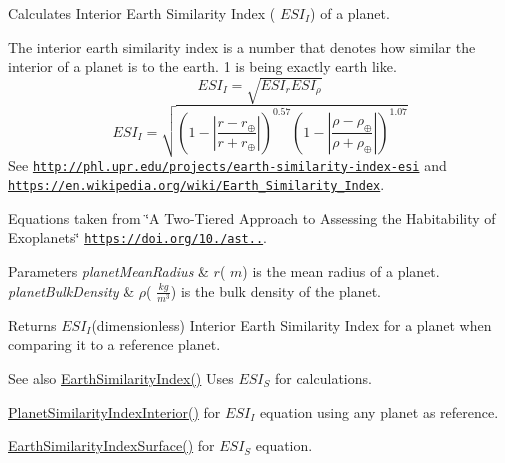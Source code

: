 Calculates Interior Earth Similarity Index ( $ESI_I$) of a planet. 

The interior earth similarity index is a number that denotes how similar the interior of a planet is to the earth. 1 is being exactly earth like. \[ESI_I=\sqrt{ESI_r ESI_\rho}\] \[ESI_I=\sqrt{\left ( 1 - \left | \frac{r-r_\oplus}{r+r_\oplus} \right | \right )^{0.57} \left ( 1 - \left | \frac{\rho-\rho_\oplus}{\rho+\rho_\oplus} \right | \right )^{1.07}}\] See \href{http://phl.upr.edu/projects/earth-similarity-index-esi}{\tt http\+://phl.\+upr.\+edu/projects/earth-\/similarity-\/index-\/esi} and \href{https://en.wikipedia.org/wiki/Earth_Similarity_Index}{\tt https\+://en.\+wikipedia.\+org/wiki/\+Earth\+\_\+\+Similarity\+\_\+\+Index}.

Equations taken from \char`\"{}\+A Two-\/\+Tiered Approach to Assessing the Habitability of Exoplanets\char`\"{} \href{https://doi.org/10.1089/ast.2010.0592}{\tt https\+://doi.\+org/10./ast..}.


\begin{DoxyParams}{Parameters}
{\em planet\+Mean\+Radius} & $r$( $m$) is the mean radius of a planet. \\
\hline
{\em planet\+Bulk\+Density} & $\rho$( $\frac{kg}{m^3}$) is the bulk density of the planet. \\
\hline
\end{DoxyParams}
\begin{DoxyReturn}{Returns}
$ESI_I$(dimensionless) Interior Earth Similarity Index for a planet when comparing it to a reference planet. 
\end{DoxyReturn}
\begin{DoxySeeAlso}{See also}
\hyperlink{group___astrophysics_ga4b86397b1c839c49ac599d49fda207d4}{Earth\+Similarity\+Index()} Uses $ESI_S$ for calculations. 

\hyperlink{group___astrophysics_ga6dc06a1a8baf6e132abed51fcf410c7f}{Planet\+Similarity\+Index\+Interior()} for $ESI_I$ equation using any planet as reference. 

\hyperlink{group___astrophysics_ga1df772b0ed354ca7f7e4a7a4af072325}{Earth\+Similarity\+Index\+Surface()} for $ESI_S$ equation. 
\end{DoxySeeAlso}
\mbox{\label{group___astrophysics_ga1df772b0ed354ca7f7e4a7a4af072325}} 
